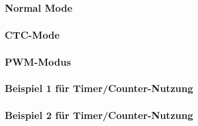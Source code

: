 {\subsubsection{Normal Mode}
\subsubsection{CTC-Mode}
\subsubsection{PWM-Modus}
\subsubsection{Beispiel 1 für Timer/Counter-Nutzung}
\subsubsection{Beispiel 2 für Timer/Counter-Nutzung}
}